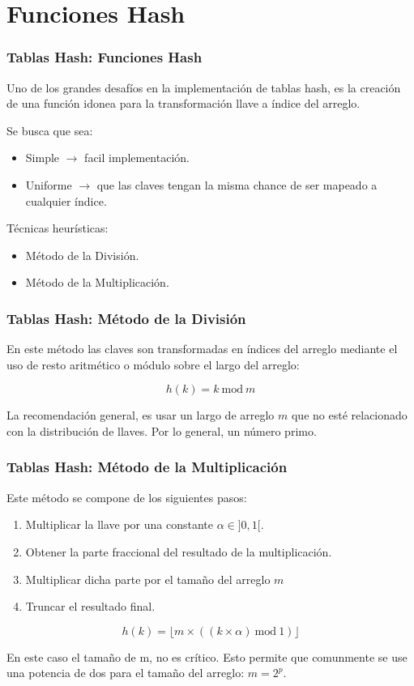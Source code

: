 \documentclass{beamer}
\begin{document}
\section{Funciones Hash}
\begin{frame}[fragile]
 \frametitle{Tablas Hash: Funciones Hash}
\small Uno de los grandes desafíos en la implementación de tablas hash, es la creación de una función idonea para la transformación llave a índice del arreglo.

Se busca que sea:
\begin{itemize}
\item Simple $\rightarrow$ facil implementación.
\item Uniforme $\rightarrow$ que las claves tengan la misma chance de ser mapeado a cualquier índice.
\end{itemize}

Técnicas heurísticas:
\begin{itemize}
\item Método de la División.
\item Método de la Multiplicación.
\end{itemize}

\end{frame}

\begin{frame}[fragile]
 \frametitle{Tablas Hash: Método de la División}
\small
En este método las claves son transformadas en índices del arreglo mediante el uso de resto aritmético o módulo sobre el largo del arreglo:

$$ h(k) = k\ \mathrm{mod}\ m$$

La recomendación general, es usar un largo de arreglo $m$ que no esté relacionado con la distribución de llaves. Por lo general, un número primo. 
\end{frame}

\begin{frame}[fragile]
 \frametitle{Tablas Hash: Método de la Multiplicación}
\small
Este método se compone de los siguientes pasos:
\begin{enumerate}
\item Multiplicar la llave por una constante $\alpha \in ]0,1[$.
\item Obtener la parte fraccional del resultado de la multiplicación.
\item Multiplicar dicha parte por el tamaño del arreglo $m$
\item Truncar el resultado final.
\end{enumerate}

$$ h(k) = \lfloor m \times  ((k\times \alpha)\ \mathrm{mod}\ 1) \rfloor $$ 

En este caso el tamaño de m, no es crítico. Esto permite que comunmente se use una potencia de dos para el tamaño del arreglo: $m = 2^p$.
\end{frame}
\end{document}
